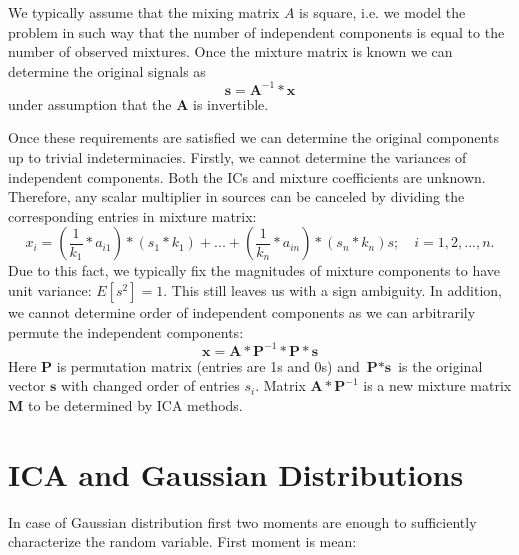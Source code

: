 \documentclass{article}
\begin{document}
We typically assume that the mixing matrix $A$ is square, i.e. we model the problem in such way that the number of independent components is equal to the number of observed mixtures. Once the mixture matrix is known we can determine the original signals as
\begin{equation}
    \textbf{s} = \textbf{A}^{-1} * \textbf{x}
\end{equation}
under assumption that the $\textbf{A}$ is invertible.

Once these requirements are satisfied we can determine the original components up to trivial indeterminacies. Firstly, we cannot determine the variances of independent components. Both the
ICs and mixture coefficients are unknown. Therefore, any scalar multiplier in sources can be canceled by dividing the corresponding entries in mixture matrix:
\begin{equation}
    x_i = (\frac{1}{k_1}*a_{i1}) * (s_1*k_1) + ... + (\frac{1}{k_n}*a_{in}) * (s_n*k_n)s;\quad i=1, 2, ..., n.
\end{equation}
Due to this fact, we typically fix the magnitudes of mixture components to have unit variance: $E\left[s^{2}\right]=1$. This still leaves us with a sign ambiguity.
In addition, we cannot determine order of independent components as we can arbitrarily permute the independent components:
\begin{equation}
    \textbf{x} = \textbf{A} * \textbf{P}^{-1} * \textbf{P} * \textbf{s}
\end{equation}
Here $\textbf{P}$ is permutation matrix (entries are 1s and 0s) and $\textbf{P} * \textbf{s}$ is the original vector $\textbf{s}$ with changed order of entries $s_i$. Matrix $\textbf{A} * \textbf{P}^{-1}$ is a new mixture matrix $\textbf{M}$ to be determined by ICA methods.

\section{ICA and Gaussian Distributions}
In case of Gaussian distribution first two moments are enough to sufficiently characterize the random variable. First moment is mean:
\end{document}
